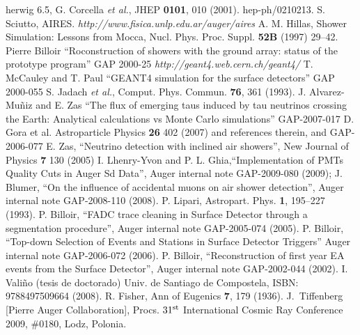 \begin{thebibliography}{1}
 {\sc herwig 6.5}, G. Corcella {\it et al.}, JHEP \textbf{0101}, 010 (2001). hep-ph/0210213.
 S. Sciutto, AIRES. \emph{http://www.fisica.unlp.edu.ar/auger/aires}
 A. M. Hillas, Shower Simulation: Lessons from Mocca, Nucl. Phys. Proc. Suppl. \textbf{52B} (1997) 29–42.
 Pierre Billoir ``Roconstruction of showers with the ground array: status of the prototype program'' GAP 2000-25 
 \emph{http://geant4.web.cern.ch/geant4/}
 T. McCauley and T. Paul ``GEANT4 simulation for the surface detectors'' GAP 2000-055
 S. Jadach {\it et al.}, Comput. Phys. Commun. {\bf 76}, 361 (1993).
 J. Alvarez-Mu\~niz and E. Zas ``The flux of emerging taus induced by tau neutrinos crossing the Earth: Analytical calculations vs Monte Carlo simulations'' GAP-2007-017 
 D. Gora et al. Astroparticle Physics \textbf{26} 402 (2007) and references therein, and GAP-2006-077
 E. Zas, ``Neutrino detection with inclined air showers'', New Journal of Physics \textbf{7} 130 (2005)
 I. Lhenry-Yvon and P. L. Ghia,``Implementation of PMTs Quality Cuts in Auger Sd Data'', Auger internal note GAP-2009-080 (2009);
 J. Blumer, ``On the influence of accidental muons on air shower detection'', Auger internal note GAP-2008-110 (2008).
 P. Lipari, Astropart. Phys. \textbf{1}, 195–227 (1993).
  P. Billoir, ``FADC trace cleaning in Surface Detector through a segmentation procedure'', Auger internal note GAP-2005-074 (2005).
  P. Billoir, ``Top-down Selection of Events and Stations in Surface Detector Triggers'' Auger internal note GAP-2006-072 (2006).
 P. Billoir, ``Reconstruction of first year EA events from the Surface Detector'', Auger internal note GAP-2002-044 (2002).
 I. Vali\~no (tesis de doctorado) Univ. de Santiago de Compostela, ISBN: 9788497509664 (2008).
 R. Fisher, Ann of Eugenics {\bf7}, 179 (1936).
 J.~Tiffenberg [Pierre Auger Collaboration], Procs. $31^{\rm st}$ International Cosmic Ray Conference 2009, $\#$0180, Lodz, Polonia.

\end{thebibliography}
